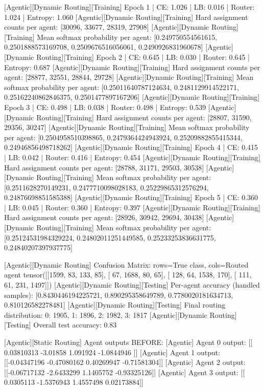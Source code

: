 [Agentic][Dynamic Routing][Training] Epoch 1 | CE: 1.026 | LB: 0.016 | Router: 1.024 | Entropy: 1.060
[Agentic][Dynamic Routing][Training] Hard assignment counts per agent: [30096, 33677, 28319, 27908]
[Agentic][Dynamic Routing][Training] Mean softmax probability per agent: [0.249750554561615, 0.2501888573169708, 0.2509676516056061, 0.2490926831960678]
[Agentic][Dynamic Routing][Training] Epoch 2 | CE: 0.645 | LB: 0.030 | Router: 0.645 | Entropy: 0.687
[Agentic][Dynamic Routing][Training] Hard assignment counts per agent: [28877, 32551, 28844, 29728]
[Agentic][Dynamic Routing][Training] Mean softmax probability per agent: [0.25011640787124634, 0.2481129914522171, 0.25162240862846375, 0.2501477897167206]
[Agentic][Dynamic Routing][Training] Epoch 3 | CE: 0.498 | LB: 0.038 | Router: 0.498 | Entropy: 0.539
[Agentic][Dynamic Routing][Training] Hard assignment counts per agent: [28807, 31590, 29356, 30247]
[Agentic][Dynamic Routing][Training] Mean softmax probability per agent: [0.2504958510398865, 0.2479364424943924, 0.25209882855415344, 0.24946856498718262]
[Agentic][Dynamic Routing][Training] Epoch 4 | CE: 0.415 | LB: 0.042 | Router: 0.416 | Entropy: 0.454
[Agentic][Dynamic Routing][Training] Hard assignment counts per agent: [28788, 31171, 29503, 30538]
[Agentic][Dynamic Routing][Training] Mean softmax probability per agent: [0.2511628270149231, 0.2477710098028183, 0.25229865312576294, 0.24876698851585388]
[Agentic][Dynamic Routing][Training] Epoch 5 | CE: 0.360 | LB: 0.045 | Router: 0.360 | Entropy: 0.397
[Agentic][Dynamic Routing][Training] Hard assignment counts per agent: [28926, 30942, 29694, 30438]
[Agentic][Dynamic Routing][Training] Mean softmax probability per agent: [0.25124531984329224, 0.24802011251449585, 0.25233253836631775, 0.24840207397937775]

[Agentic][Dynamic Routing] Confusion Matrix: rows=True class, cols=Routed agent
tensor([[1599,   83,  133,   85],
[  67, 1688,   80,   65],
[ 128,   64, 1538,  170],
[ 111,   61,  231, 1497]])
[Agentic][Dynamic Routing][Testing] Per-agent accuracy (handled samples): [0.8430446194225721, 0.890295358649789, 0.7780020181634713, 0.810126582278481]
[Agentic][Dynamic Routing][Testing] Final routing distribution: {0: 1905, 1: 1896, 2: 1982, 3: 1817}
[Agentic][Dynamic Routing][Testing] Overall test accuracy: 0.83

[Agentic][Static Routing] Agent outputs BEFORE:
[Agentic] Agent 0 output: [[ 0.03810313 -3.01858     1.091924   -1.0844946 ]]
[Agentic] Agent 1 output: [[-0.04347196 -0.47080162  0.40269947 -0.71581304]]
[Agentic] Agent 2 output: [[-0.06717132 -2.6433299   1.1405752  -0.93325126]]
[Agentic] Agent 3 output: [[ 0.0305113  -1.5376943   1.4557498   0.02173884]]

